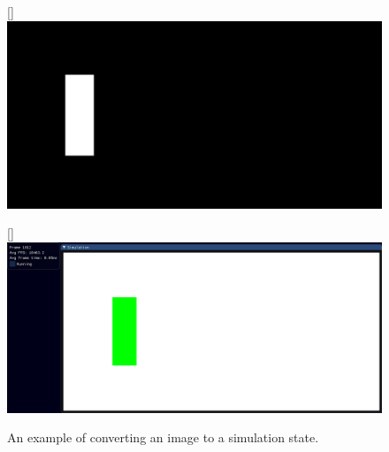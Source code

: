 \begin{figure}[ht]
    \centering

    [\linewidth]{\includegraphics[]{Ch42Design/figures/simple_layout.png}
    }
    
    [\linewidth]{\includegraphics[width=\linewidth]{Ch42Design/figures/example_sim_of_simple_layout.png}
    }
    
    \caption{An example of converting an image to a simulation state.}
    \label{fig:ExampleMakeinput}
\end{figure}